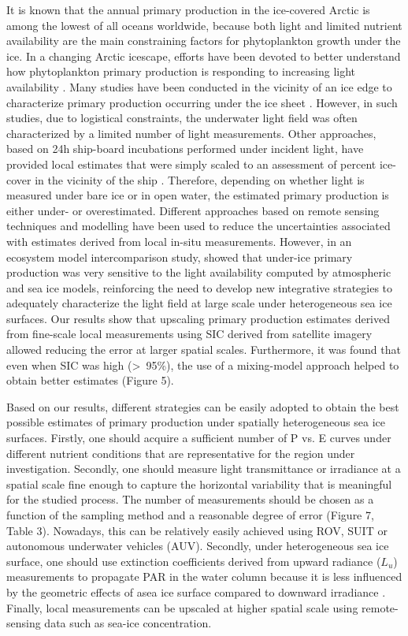 \documentclass[draft]{agujournal2018}
\newcommand{\lu}{\ensuremath{{L_u}}}
\begin{document}
It is known that the annual primary production in the ice-covered Arctic is among the lowest of all oceans worldwide, because both light and limited nutrient availability are the main constraining  factors for phytoplankton growth under the ice. In a changing Arctic icescape, efforts have been devoted to better understand how phytoplankton primary production is responding to increasing light availability \citep{Fernandez-Mendez2015, Vancoppenolle2013}. Many studies have been conducted in the vicinity of an ice edge to characterize primary production occurring under the ice sheet \citep{Arrigo2012, Arrigo2014, Mundy2009}. However, in such studies, due to logistical constraints, the underwater light field was often characterized by a limited number of light measurements. Other approaches, based on 24h ship-board incubations performed under incident light, have provided local estimates that were simply scaled to an assessment of percent ice-cover in the vicinity of the ship \citep{Smith1995, Gosselin1997, Mei2003}. Therefore, depending on whether light is measured under bare ice or in open water, the estimated primary production is either under- or overestimated. Different approaches based on remote sensing techniques and modelling have been used to reduce the uncertainties associated with estimates derived from local in-situ measurements. However, in an ecosystem model intercomparison study, \citet{Jin2015} showed that under-ice primary production was very sensitive to the light availability computed by atmospheric and sea ice models, reinforcing the need to develop new integrative strategies to adequately characterize the light field at large scale under heterogeneous sea ice surfaces. Our results show that upscaling primary production estimates derived from fine-scale local measurements using SIC derived from satellite imagery allowed reducing the error at larger spatial scales. Furthermore, it was found that even when SIC was high (\textgreater~95\%), the use of a mixing-model approach helped to obtain better estimates (Figure 5).

Based on our results, different strategies can be easily adopted to obtain the best possible estimates of primary production under spatially heterogeneous sea ice surfaces. Firstly, one should acquire a sufficient number of P vs. E curves under different nutrient conditions that are representative for the region under investigation. Secondly, one should measure light transmittance or irradiance at a spatial scale fine enough to capture the horizontal variability that is meaningful for the studied process. The number of measurements should be chosen as a function of the sampling method and a reasonable degree of error (Figure 7, Table 3). Nowadays, this can be relatively easily achieved using ROV, SUIT or autonomous underwater vehicles (AUV). Secondly, under heterogeneous sea ice surface, one should use extinction coefficients derived from upward radiance (\lu{}) measurements to propagate PAR in the water column because it is less influenced by the geometric effects of asea ice surface compared to downward irradiance \citep{Katlein2016, Massicotte2018}. Finally, local measurements can be upscaled at higher spatial scale using remote-sensing data such as sea-ice concentration.
\end{document}
